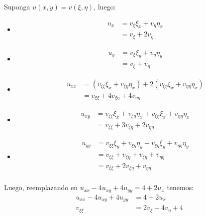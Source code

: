 \begin{homeworkProblem}
\begin{enumerate}[(i)]
\begin{solucion}
\begin{enumerate}
        Suponga $u(x,y)=v(\xi,\eta)$, luego:
        \begin{itemize}
            \item \begin{align*}
                u_{x}&=v_{\xi}\xi_{x}+v_{\eta}\eta_{x}\\
                &=v_{\xi}+2v_{\eta}
            \end{align*}
            \item \begin{align*}
                u_{y}&=v_{\xi}\xi_{y}+v_{\eta}\eta_{y}\\
                &=v_{\xi}+v_{\eta}
            \end{align*}
            \item \begin{align*}
                u_{xx}&=(v_{\xi\xi}\xi_{x}+v_{\xi\eta}\eta_{x})+2(v_{\xi\eta}\xi_{x}+v_{\eta\eta}\eta_{x})\\
                &=v_{\xi\xi}+4v_{\xi\eta}+4v_{\eta\eta}
            \end{align*}
            \item \begin{align*}
                u_{xy}&=v_{\xi\xi}\xi_{x}+v_{\xi\eta}\eta_{x}+v_{\xi\eta}\xi_{x}+v_{\eta\eta}\eta_{x}\\
                &=v_{\xi\xi}+3v_{\xi\eta}+2v_{\eta\eta}
            \end{align*}
            \item \begin{align*}
                u_{yy}&=v_{\xi\xi}\xi_{y}+v_{\xi\eta}\eta_{y}+v_{\xi\eta}\xi_{y}+v_{\eta\eta}\eta_{y}\\
                &=v_{\xi\xi}+v_{\xi\eta}+v_{\xi\eta}+v_{\eta\eta}\\
                &=v_{\xi\xi}+2v_{\xi\eta}+v_{\eta\eta}\\
            \end{align*}
        \end{itemize}
        Luego, reemplazando en $u_{xx}-4u_{xy}+4u_{yy}=4+2u_{x}$ tenemos:
        \begin{align*}
            u_{xx}-4u_{xy}+4u_{yy}&=4+2u_{x}\\
            v_{\xi\xi}&=2v_{\xi}+4v_{\eta}+4            
        \end{align*}
        

\end{enumerate}
\end{solucion}
\end{enumerate}
\end{homeworkProblem}

